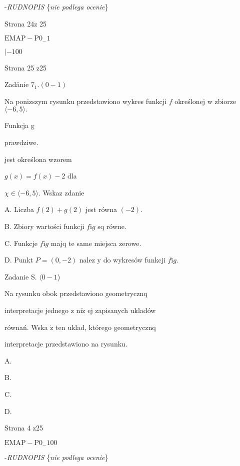 \documentclass[a4paper,12pt]{article}
\begin{document}
-{\it RUDNOPIS} \{{\it nie podlega ocenie}\}

Strona 24z 25

$\mathrm{E}\mathrm{M}\mathrm{A}\mathrm{P}-\mathrm{P}0_{-}1$





$|-100$

Strona 25 z25




















Zadänie $7_{1}. (0-1)$

Na ponizszym rysunku przedstawiono wykres funkcji $f$ określonej w zbiorze $\langle-6, 5\rangle.$

Funkcja g

prawdziwe.

jest określona wzorem

$g(x)=f(x)-2$ dla

$\chi\in\langle-6,5\rangle$. Wskaz zdanie

A. Liczba $f(2)+g(2)$ jest równa $(-2).$

B. Zbiory wartości funkcji $f \mathrm{i} g$ sq równe.

C. Funkcje $f \mathrm{i} g$ majq te same miejsca zerowe.

D. Punkt $P=(0,-2)$ nalez $\mathrm{y}$ do wykresów funkcji $f \mathrm{i} g.$

Zadanie S. $\langle 0-1$)

Na rysunku obok przedstawiono geometrycznq

interpretacje jednego z $\mathrm{n}\mathrm{i}\dot{\mathrm{z}}$ ej zapisanych ukladów

równań. Wska $\dot{\mathrm{z}}$ ten uklad, którego geometrycznq

interpretacje przedstawiono na rysunku.

A. 

B. 

C. 

D. 

Strona 4 z25

$\mathrm{E}\mathrm{M}\mathrm{A}\mathrm{P}-\mathrm{P}0_{-}100$





-{\it RUDNOPIS} \{{\it nie podlega ocenie}\}
\end{document}
